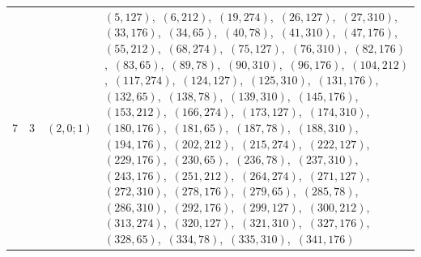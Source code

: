 \documentclass[11pt]{article}
\begin{document}
\begin{longtable}{@{}rrl>{\raggedright\arraybackslash}p{}@{}}
7 & 3 & $(2,0;1)$ & $(5,127)$,\allowbreak\ $(6,212)$,\allowbreak\ $(19,274)$,\allowbreak\ $(26,127)$,\allowbreak\ $(27,310)$,\allowbreak\ $(33,176)$,\allowbreak\ $(34,65)$,\allowbreak\ $(40,78)$,\allowbreak\ $(41,310)$,\allowbreak\ $(47,176)$,\allowbreak\ $(55,212)$,\allowbreak\ $(68,274)$,\allowbreak\ $(75,127)$,\allowbreak\ $(76,310)$,\allowbreak\ $(82,176)$,\allowbreak\ $(83,65)$,\allowbreak\ $(89,78)$,\allowbreak\ $(90,310)$,\allowbreak\ $(96,176)$,\allowbreak\ $(104,212)$,\allowbreak\ $(117,274)$,\allowbreak\ $(124,127)$,\allowbreak\ $(125,310)$,\allowbreak\ $(131,176)$,\allowbreak\ $(132,65)$,\allowbreak\ $(138,78)$,\allowbreak\ $(139,310)$,\allowbreak\ $(145,176)$,\allowbreak\ $(153,212)$,\allowbreak\ $(166,274)$,\allowbreak\ $(173,127)$,\allowbreak\ $(174,310)$,\allowbreak\ $(180,176)$,\allowbreak\ $(181,65)$,\allowbreak\ $(187,78)$,\allowbreak\ $(188,310)$,\allowbreak\ $(194,176)$,\allowbreak\ $(202,212)$,\allowbreak\ $(215,274)$,\allowbreak\ $(222,127)$,\allowbreak\ $(229,176)$,\allowbreak\ $(230,65)$,\allowbreak\ $(236,78)$,\allowbreak\ $(237,310)$,\allowbreak\ $(243,176)$,\allowbreak\ $(251,212)$,\allowbreak\ $(264,274)$,\allowbreak\ $(271,127)$,\allowbreak\ $(272,310)$,\allowbreak\ $(278,176)$,\allowbreak\ $(279,65)$,\allowbreak\ $(285,78)$,\allowbreak\ $(286,310)$,\allowbreak\ $(292,176)$,\allowbreak\ $(299,127)$,\allowbreak\ $(300,212)$,\allowbreak\ $(313,274)$,\allowbreak\ $(320,127)$,\allowbreak\ $(321,310)$,\allowbreak\ $(327,176)$,\allowbreak\ $(328,65)$,\allowbreak\ $(334,78)$,\allowbreak\ $(335,310)$,\allowbreak\ $(341,176)$\\

\end{longtable}
\end{document}
